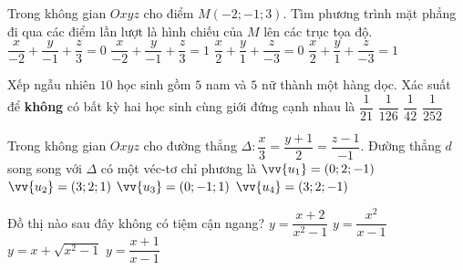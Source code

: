 \begin{ex}%
Trong không gian $Oxyz$ cho điểm $M(-2;-1;3)$. Tìm phương trình mặt phẳng đi qua các điểm lần lượt là hình chiếu của $M$ lên các trục tọa độ.
\choice
{$\dfrac{x}{-2}+\dfrac{y}{-1}+\dfrac{z}{3}=0$}
{\True $\dfrac{x}{-2}+\dfrac{y}{-1}+\dfrac{z}{3}=1$}
{$\dfrac{x}{2}+\dfrac{y}{1}+\dfrac{z}{-3}=0$}
{$\dfrac{x}{2}+\dfrac{y}{1}+\dfrac{z}{-3}=1$}
\end{ex}

\begin{ex}%
Xếp ngẫu nhiên $10$ học sinh gồm $5$ nam và $5$ nữ thành một hàng dọc. Xác suất để \textbf{không} có bất kỳ hai học sinh cùng giới đứng cạnh nhau là 
\choice
{$\dfrac{1}{21}$}
{\True $\dfrac{1}{126}$}
{$\dfrac{1}{42}$}
{$\dfrac{1}{252}$}
\end{ex}

\begin{ex}%
Trong không gian $Oxyz$ cho đường thẳng $\Delta\colon \dfrac{x}{3}=\dfrac{y+1}{2}=\dfrac{z-1}{-1}$. Đường thẳng $d$ song song với $\Delta$ có một véc-tơ chỉ phương là
\choice
{$\vv{u_1}=(0;2;-1)$}
{$\vv{u_2}=(3;2;1)$}
{$\vv{u_3}=(0;-1;1)$}
{\True $\vv{u_4}=(3;2;-1)$}
\end{ex}

\begin{ex}%
Đồ thị nào sau đây không có tiệm cận ngang?
\choice
{$y=\dfrac{x+2}{x^2-1}$}
{\True $y=\dfrac{x^2}{x-1}$}
{$y=x+\sqrt{x^2-1}$}
{$y=\dfrac{x+1}{x-1}$}
\end{ex}

